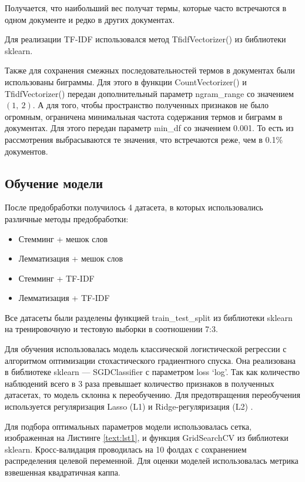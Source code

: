 \documentclass[14pt]{mmcs_article}
\begin{document}
Получается, что наибольший вес получат термы, которые часто встречаются в одном документе и редко в других документах.

Для реализации TF-IDF использовался метод TfidfVectorizer() из библиотеки sklearn. 

Также для сохранения смежных последовательностей термов в документах были использованы биграммы. Для этого в функции CountVectorizer() и TfidfVectorizer() передан дополнительный параметр ngram\_range со значением $(1,\ 2)$. А для того, чтобы пространство полученных признаков не было огромным, ограничена минимальная частота содержания термов и биграмм в документах. Для этого передан параметр min\_df со значением 0.001. То есть из рассмотрения выбрасываются те значения, что встречаются реже, чем в 0.1\% документов.


\subsection{Обучение модели}

После предобработки получилось 4 датасета, в которых использовались различные методы предобработки:
\begin{itemize}
	\item Стемминг + мешок слов
	\item Лемматизация + мешок слов
	\item Стемминг + TF-IDF
	\item Лемматизация + TF-IDF
\end{itemize}

Все датасеты были разделены функцией train\_test\_split из библиотеки sklearn на тренировочную и тестовую выборки в соотношении 7:3.

Для обучения использовалась модель классической логистической регрессии с алгоритмом оптимизации стохастического градиентного спуска. Она реализована в библиотеке sklearn --- SGDClassifier с параметром loss `log'.  Так как количество наблюдений всего в 3 раза превышает количество признаков в полученных датасетах, то модель склонна к переобучению. Для предотвращения переобучения используется регуляризация Lasso (L1) и Ridge-регуляризация (L2) \cite{lib:regular}.

Для подбора оптимальных параметров модели использовалась сетка, изображенная на Листинге \ref{text:lst1}, и функция GridSearchCV из библиотеки sklearn. Кросс-валидация проводилась на 10 фолдах с сохранением распределения целевой переменной. Для оценки моделей использовалась метрика взвешенная квадратичная каппа.
\end{document}
